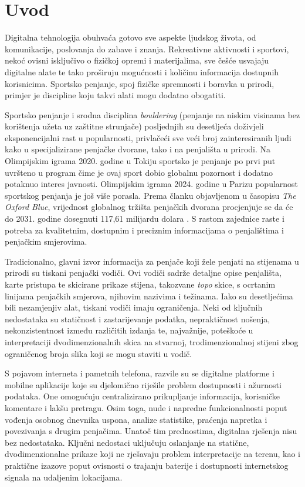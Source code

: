\chapter*{Uvod}

Digitalna tehnologija obuhvaća gotovo sve aspekte ljudskog života, od komunikacije, poslovanja do zabave i znanja. Rekreativne aktivnosti i sportovi, nekoć ovisni isključivo o fizičkoj opremi i materijalima, sve češće usvajaju digitalne alate te tako proširuju mogućnosti i količinu informacija dostupnih korisnicima. Sportsko penjanje, spoj fizičke spremnosti i boravka u prirodi, primjer je discipline koju takvi alati mogu dodatno obogatiti.

Sportsko penjanje i srodna disciplina \textit{bouldering} (penjanje na niskim visinama bez korištenja užeta uz zaštitne strunjače) posljednjih su desetljeća doživjeli eksponencijalni rast u popularnosti, privlačeći sve veći broj zainteresiranih ljudi kako u specijalizirane penjačke dvorane, tako i na penjališta u prirodi. Na Olimpijskim igrama 2020. godine u Tokiju sportsko je penjanje po prvi put uvršteno u program čime je ovaj sport dobio globalnu pozornost i dodatno potaknuo interes javnosti. Olimpijskim igrama 2024. godine u Parizu popularnost sportskog penjanja je još više porasla. 
Prema članku objavljenom u časopisu \textit{The Oxford Blue}, vrijednost globalnog tržišta penjačkih dvorana procjenjuje se da će do 2031. godine dosegnuti 117,61 milijardu dolara \cite{the_oxford_blue_rock_climb}. S rastom zajednice raste i potreba za kvalitetnim, dostupnim i preciznim informacijama o penjalištima i penjačkim smjerovima.

Tradicionalno, glavni izvor informacija za penjače koji žele penjati na stijenama u prirodi su tiskani penjački vodiči. Ovi vodiči sadrže detaljne opise penjališta, karte pristupa te skicirane prikaze stijena, takozvane \textit{topo} skice, s ocrtanim linijama penjačkih smjerova, njihovim nazivima i težinama. Iako su desetljećima bili nezamjenjiv alat, tiskani vodiči imaju ograničenja. Neki od ključnih nedostataka su statičnost i zastarijevanje podatka, nepraktičnost nošenja, nekonzistentnost između različitih izdanja te, najvažnije, poteškoće u interpretaciji dvodimenzionalnih skica na stvarnoj, trodimenzionalnoj stijeni zbog ograničenog broja slika koji se mogu staviti u vodič.

S pojavom interneta i pametnih telefona, razvile su se digitalne platforme i mobilne aplikacije koje su djelomično riješile problem dostupnosti i ažurnosti podataka. One omogućuju centralizirano prikupljanje informacija, korisničke komentare i lakšu pretragu. Osim toga, nude i napredne funkcionalnosti poput vođenja osobnog dnevnika uspona, analize statistike, praćenja napretka i povezivanja s drugim penjačima.
Unatoč tim prednostima, digitalna rješenja nisu bez nedostataka. Ključni nedostaci uključuju oslanjanje na statične, dvodimenzionalne prikaze koji ne rješavaju problem interpretacije na terenu, kao i praktične izazove poput ovisnosti o trajanju baterije i dostupnosti internetskog signala na udaljenim lokacijama.

